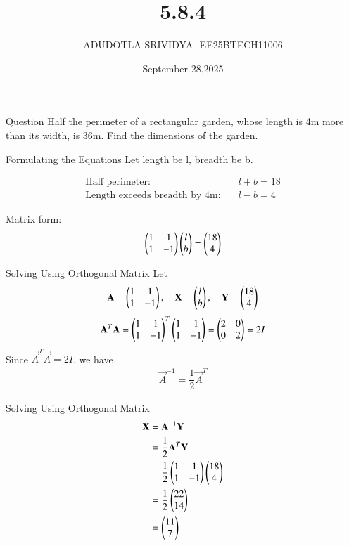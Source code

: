 \documentclass{beamer}
\begin{document}
\title 
{5.8.4}
\date{September 28,2025}


\author 
{ADUDOTLA SRIVIDYA -EE25BTECH11006}






\frame{\titlepage}

\begin{frame}{Question}
Half the perimeter of a rectangular garden, whose length is 4m more than its width, is 36m. Find the dimensions of the garden.
\end{frame}

\begin{frame}{Formulating the Equations}
Let length be l, breadth be b.

\begin{align}
\text{Half perimeter:} \quad & l + b = 18 \\
\text{Length exceeds breadth by 4m:} \quad & l - b = 4
\end{align}

Matrix form:
\begin{align}
\begin{pmatrix}1 & 1 \\ 1 & -1\end{pmatrix} \begin{pmatrix}l \\ b\end{pmatrix} = \begin{pmatrix}18 \\ 4\end{pmatrix}
\end{align}
\end{frame}

\begin{frame}{Solving Using Orthogonal Matrix}
Let
\begin{align}
    \mathbf{A} = \begin{pmatrix}1 & 1 \\ 1 & -1\end{pmatrix}, \quad \mathbf{X} = \begin{pmatrix}l \\ b\end{pmatrix}, \quad \mathbf{Y} = \begin{pmatrix}18 \\ 4\end{pmatrix}
\end{align}
\begin{align}
    \mathbf{A}^T \mathbf{A} = \begin{pmatrix}1 & 1 \\ 1 & -1\end{pmatrix}^T \begin{pmatrix}1 & 1 \\ 1 & -1\end{pmatrix} 
          = \begin{pmatrix}2 & 0 \\ 0 & 2\end{pmatrix} = 2I
\end{align}
Since $\vec{A}^T \vec{A} = 2I$, we have
\begin{align}
    \vec{A}^{-1} = \dfrac{1}{2}\vec{A}^T
\end{align}
\end{frame}

\begin{frame}{Solving Using Orthogonal Matrix}
\begin{align}
\mathbf{X}&= \mathbf{A}^{-1}\mathbf{Y} \\
       &= \frac{1}{2}\mathbf{A}^T \mathbf{Y} \\
       &= \frac{1}{2}\begin{pmatrix}1 & 1 \\ 1 & -1\end{pmatrix}\begin{pmatrix}18 \\ 4\end{pmatrix} \\
       &= \frac{1}{2}\begin{pmatrix}22 \\ 14\end{pmatrix} \\
       &= \begin{pmatrix}11 \\ 7\end{pmatrix}
\end{align}
\end{frame}
\end{document}
